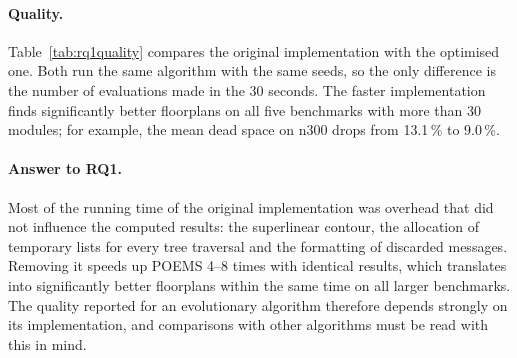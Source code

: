 \paragraph{Quality.} Table~\ref{tab:rq1quality} compares the original implementation with the optimised one. Both run the same algorithm with the same seeds, so the only difference is the number of evaluations made in the 30 seconds. The faster implementation finds significantly better floorplans on all five benchmarks with more than 30 modules; for example, the mean dead space on n300 drops from 13.1\,\% to 9.0\,\%.



\paragraph{Answer to RQ1.} Most of the running time of the original implementation was overhead that did not influence the computed results: the superlinear contour, the allocation of temporary lists for every tree traversal and the formatting of discarded messages. Removing it speeds up POEMS 4--8 times with identical results, which translates into significantly better floorplans within the same time on all larger benchmarks. The quality reported for an evolutionary algorithm therefore depends strongly on its implementation, and comparisons with other algorithms must be read with this in mind.
